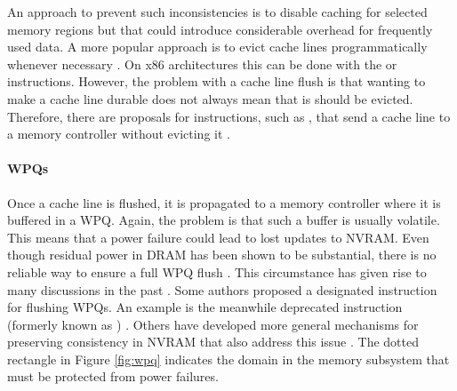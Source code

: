An approach to prevent such inconsistencies is to disable caching for selected
memory regions but that could introduce considerable overhead for frequently
used data. A more popular approach is to evict cache lines programmatically
whenever necessary \cite{condit2009better, dulloor2014system, oukid2017data}. On
x86 architectures this can be done with the  or 
instructions. However, the problem with a cache line flush is that wanting to
make a cache line durable does not always mean that is should be evicted.
Therefore, there are proposals for instructions, such as , that send
a cache line to a memory controller without evicting it \cite{kolli2016high,
oukid2017data}.


\paragraph{\acp{WPQ}}

Once a cache line is flushed, it is propagated to a memory controller where it
is buffered in a \ac{WPQ}. Again, the problem is that such a buffer is usually
volatile. This means that a power failure could lead to lost updates to
\ac{NVRAM}. Even though residual power in \ac{DRAM} has been shown to be
substantial, there is no reliable way to ensure a full \ac{WPQ} flush
\cite{halderman2008lest}. This circumstance has given rise to many discussions
in the past \cite{condit2009better, dulloor2014system, kolli2016high}. Some
authors proposed a designated instruction for flushing \acp{WPQ}. An example is
the meanwhile deprecated  instruction (formerly known as
) \cite{dulloor2014system, oukid2015instant,
volos2017whisper}. Others have developed more general mechanisms for preserving
consistency in \ac{NVRAM} that also address this issue \cite{condit2009better,
pelley2014memory}. The dotted rectangle in Figure \ref{fig:wpq} indicates the
domain in the memory subsystem that must be protected from power failures.

